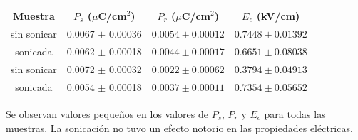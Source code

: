 \documentclass[../main.tex]{subfiles}
\begin{document}
\begin{table}[H]
    \centering
    \begin{tabular}{|c||c|c|c|}
        \hline
        Muestra & $P_s$ ($\mu$C/cm$^2$) & $P_r$ ($\mu$C/cm$^2$) & $E_c$ (kV/cm) \\
        \hline\hline
        \neod{} sin sonicar & 0.0067 $\pm$ 0.00036 & $0.0054 \pm 0.00012$ & $0.7448 \pm 0.01392$ \\
        \hline
        \neod{} sonicada & 0.0062 $\pm$ 0.00018 & $0.0044 \pm 0.00017$ & $0.6651 \pm 0.08038$ \\
        \hline
        \sama{} sin sonicar & 0.0072 $\pm$ 0.00032 & $0.0022 \pm 0.00062$ & $0.3794 \pm 0.04913$ \\
        \hline
        \sama{} sonicada & 0.0054 $\pm$ 0.00018 & $0.0037 \pm 0.00011$ & $0.7354 \pm 0.05652$ \\
        \hline
        \end{tabular} 
    \label{tabla:respolar}
\end{table}
Se observan valores pequeños en los valores de $P_s$, $P_r$ y $E_c$ para todas las muestras. La sonicación no tuvo un efecto notorio en las propiedades eléctricas.
\end{document}
